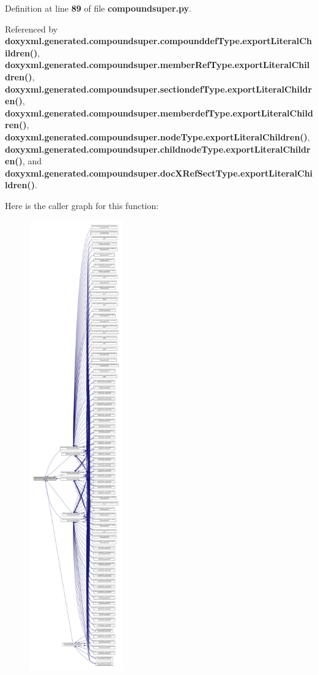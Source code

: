 Definition at line {\bf 89} of file {\bf compoundsuper.\+py}.



Referenced by {\bf doxyxml.\+generated.\+compoundsuper.\+compounddef\+Type.\+export\+Literal\+Children()}, {\bf doxyxml.\+generated.\+compoundsuper.\+member\+Ref\+Type.\+export\+Literal\+Children()}, {\bf doxyxml.\+generated.\+compoundsuper.\+sectiondef\+Type.\+export\+Literal\+Children()}, {\bf doxyxml.\+generated.\+compoundsuper.\+memberdef\+Type.\+export\+Literal\+Children()}, {\bf doxyxml.\+generated.\+compoundsuper.\+node\+Type.\+export\+Literal\+Children()}, {\bf doxyxml.\+generated.\+compoundsuper.\+childnode\+Type.\+export\+Literal\+Children()}, and {\bf doxyxml.\+generated.\+compoundsuper.\+doc\+X\+Ref\+Sect\+Type.\+export\+Literal\+Children()}.



Here is the caller graph for this function\+:
\nopagebreak
\begin{figure}[H]
\begin{center}
\leavevmode
\includegraphics[height=550pt]{dc/dbe/namespacedoxyxml_1_1generated_1_1compoundsuper_a7516961ca042b7f5089b7e6f68b45a49_icgraph}
\end{center}
\end{figure}



